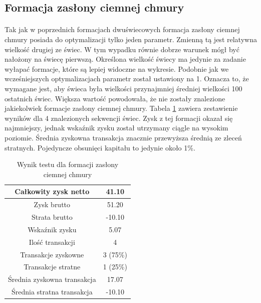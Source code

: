 \documentclass[pdflatex,11pt]{aghdpl}
\begin{document}
\subsection{Formacja zasłony ciemnej chmury}
\paragraph{}

Tak jak w poprzednich formacjach dwuświecowych formacja zasłony ciemnej chmury posiada do optymalizacji tylko jeden parametr. Zmienną tą jest relatywna wielkość drugiej ze świec. W tym wypadku równie dobrze warunek mógł być nałożony na świecę pierwszą. Określona wielkość świecy ma jedynie za zadanie wyłapać formacje, które są lepiej widoczne na wykresie. Podobnie jak we wcześniejszych optymalizacjach parametr został ustawiony na 1. Oznacza to, że wymagane jest, aby świeca była wielkości przynajmniej średniej wielkości 100 ostatnich świec. Większa wartość powodowała, że nie zostały znalezione jakiekolwiek formacje zasłony ciemnej chmury. Tabela \ref{raport_zaslona} zawiera zestawienie wyników dla 4 znalezionych sekwencji świec. Zysk z tej formacji okazał się najmniejszy, jednak wskaźnik zysku został utrzymany ciągle na wysokim poziomie. Średnia zyskowna transakcja znacznie przewyższa średnią ze zleceń stratnych. Pojedyncze obsunięci kapitału to jedynie około 1\%. 
\begin{table}[h!]
\caption{Wynik testu dla formacji zasłony ciemnej chmury}
\begin{center}
\begin{tabular}{|c|c|}
\hline 
Całkowity zysk netto & 41.10\\
\hline
Zysk brutto & 51.20\\
\hline
Strata brutto & -10.10\\
\hline
Wskaźnik zysku & 5.07 \\
\hline
\hline
Ilość transakcji & 4 \\
\hline
Transakcje zyskowne & 3 (75\%) \\
\hline
Transakcje stratne & 1 (25\%) \\
\hline
\hline
Średnia zyskowna transakcja & 17.07 \\
\hline
Średnia stratna transakcja & -10.10 \\
\hline
\end{tabular} 
\label{raport_zaslona}
\end{center}
\end{table}
\end{document}
